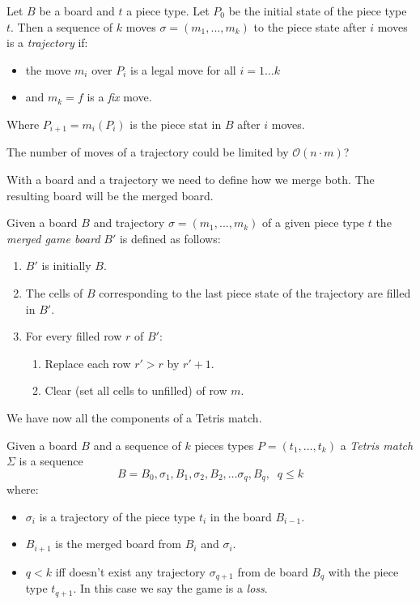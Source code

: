 \begin{definition}
 Let $B$ be a board and $t$ a piece type. Let $P_0$ be the initial state of the piece type $t$. Then a sequence of $k$ moves $\sigma = (m_1, ..., m_k)$ to the piece state after $i$ moves is a \emph{trajectory} if:

 \begin{itemize}
  \item the move $m_i$ over $P_i$ is a legal move for all $i = 1 \dots k$
  \item and $m_k = f$ is a \emph{fix} move.
 \end{itemize}
 
 Where $P_{i+1} = m_i(P_i)$ is the piece stat in $B$ after $i$ moves.
\end{definition}

The number of moves of a trajectory could be limited by $\mathcal{O}(n \cdot m)$?

With a board and a trajectory we need to define how we merge both. The resulting board will be the merged board. 

\begin{definition}
  Given a board $B$ and trajectory $\sigma = (m_1, ..., m_k)$ of a given piece type $t$ the \emph{merged game board} $B'$ is defined as follows:
  \begin{enumerate}
    \item $B'$ is initially $B$.
    \item The cells of $B$ corresponding to the last piece state of the trajectory are filled in $B'$.
    \item For every filled row $r$ of $B'$:
      \begin{enumerate}
        \item Replace each row $r' > r$ by $r'+1$.
        \item Clear (set all cells to unfilled) of row $m$.
      \end{enumerate}
  \end{enumerate}
\end{definition}

We have now all the components of a Tetris match.

\begin{definition}
  Given a board $B$ and a sequence of $k$ pieces types $P = (t_1,\dots,t_k)$ a \emph{Tetris match} $\Sigma$ is a sequence
  $$ B = B_0, \sigma_1, B_1, \sigma_2, B_2, \dots  \sigma_q, B_q, \; \; q \leq k$$ 
  where:
  \begin{itemize}
    \item $\sigma_i$ is a trajectory of the piece type $t_i$ in the board $B_{i-1}$.
    \item $B_{i+1}$ is the merged board from $B_i$ and $\sigma_i$.
    \item $q < k$ iff doesn't exist any trajectory $\sigma_{q+1}$ from de board $B_q$ with the piece type $t_{q+1}$. In this case we say the game is a \emph{loss}.
  \end{itemize}
\end{definition}

